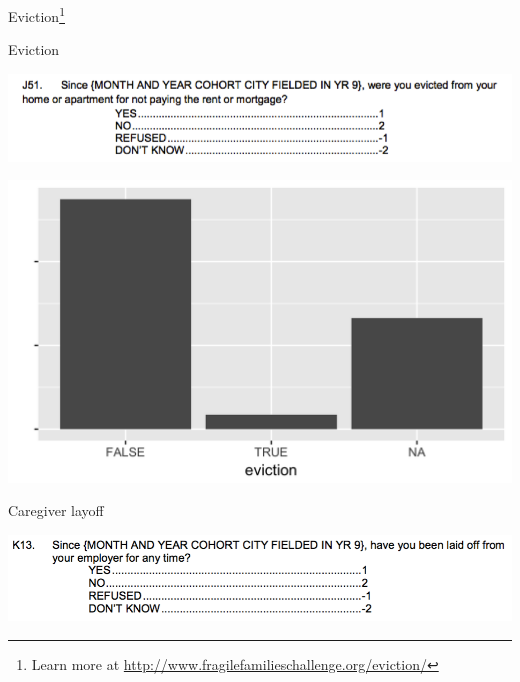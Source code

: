 \documentclass[aspectratio=169]{beamer}
\begin{document}
\begin{frame}

\Large{
\begin{center}
Eviction\footnote{Learn more at \url{http://www.fragilefamilieschallenge.org/eviction/}}
\end{center}
}

\end{frame}
\begin{frame}{Eviction}

\centering
\includegraphics[width = .9\textwidth]{figures/eviction_questionnaire}

\end{frame}
\begin{frame}

\centering
\includegraphics[width = .8\textwidth]{figures/evictionDist}

\end{frame}
\begin{frame}{Caregiver layoff}

\centering
\includegraphics[width = .9\textwidth]{figures/layoff_questionnaire}

\end{frame}
\end{document}
